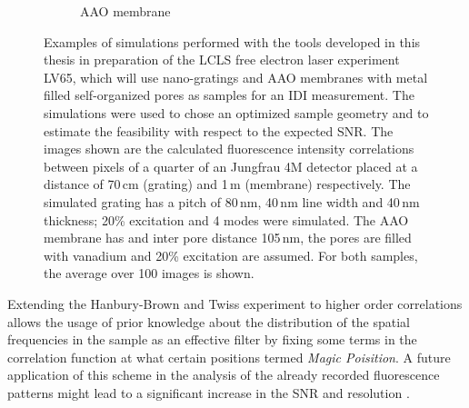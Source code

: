 \begin{figure}
\begin{subfigure}[b]{0.37\textwidth}
		\caption{AAO membrane  }
		\label{fig:outlook_aao}
	\end{subfigure}
	\caption[Simulations in Preparation of LV65 Experiment]{Examples of simulations performed with the tools developed in this thesis in preparation of the LCLS free electron laser experiment LV65, which will use nano-gratings and AAO membranes with metal filled self-organized pores as samples for an IDI measurement. The simulations were used to chose an optimized sample geometry and to estimate the feasibility with respect to the expected SNR. The images shown are the calculated fluorescence intensity correlations between pixels of a quarter of an Jungfrau 4M detector placed at a distance of 70\,cm (grating) and 1\,m (membrane) respectively. The simulated grating has a pitch of 80\,nm, 40\,nm line width and 40\,nm thickness; 20\% excitation and 4 modes were simulated. The AAO membrane has and inter pore distance 105\,nm, the pores are filled with vanadium and 20\% excitation are assumed. For both samples, the average over 100 images is shown.}
\end{figure}



Extending the Hanbury-Brown and Twiss experiment to higher order correlations allows the usage of prior knowledge about the distribution of the spatial frequencies in the sample as an effective filter by fixing some terms in the correlation function at what certain positions termed  \textit{Magic Poisition}. A future application of this scheme in the analysis of the already recorded fluorescence patterns might lead to a significant increase in the SNR and resolution \cite{schneider2018,thiel2007}.